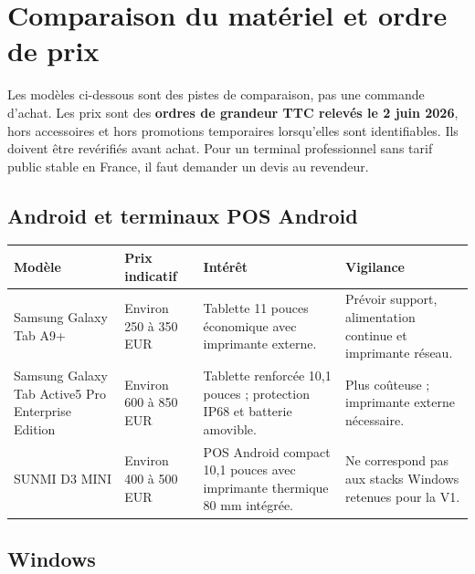 \documentclass[11pt,a4paper]{article}
\begin{document}
\clearpage
\section{Comparaison du matériel et ordre de prix}

Les modèles ci-dessous sont des pistes de comparaison, pas une commande d'achat. Les prix sont des
\textbf{ordres de grandeur TTC relevés le 2 juin 2026}, hors accessoires et hors promotions
temporaires lorsqu'elles sont identifiables. Ils doivent être revérifiés avant achat. Pour un
terminal professionnel sans tarif public stable en France, il faut demander un devis au revendeur.

\subsection{Android et terminaux POS Android}

\begin{tabularx}{\textwidth}{L{3.2cm} L{2.45cm} Y L{3.35cm}}
  \toprule
  \color{white}\textbf{Modèle} &
  \color{white}\textbf{Prix indicatif} &
  \color{white}\textbf{Intérêt} &
  \color{white}\textbf{Vigilance} \\
  \midrule
  Samsung Galaxy Tab A9+ &
  Environ 250 à 350 EUR &
  Tablette 11 pouces économique avec imprimante externe. &
  Prévoir support, alimentation continue et imprimante réseau. \\
  Samsung Galaxy Tab Active5 Pro Enterprise Edition &
  Environ 600 à 850 EUR &
  Tablette renforcée 10,1 pouces ; protection IP68 et batterie amovible. &
  Plus coûteuse ; imprimante externe nécessaire. \\
  SUNMI D3 MINI &
  Environ 400 à 500 EUR &
  POS Android compact 10,1 pouces avec imprimante thermique 80 mm intégrée. &
  Ne correspond pas aux stacks Windows retenues pour la V1. \\
  \bottomrule
\end{tabularx}

\subsection{Windows}
\end{document}
